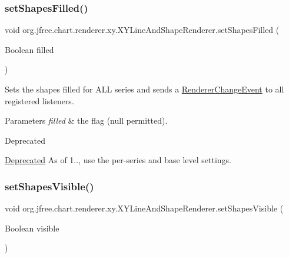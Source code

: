 \subsubsection{\texorpdfstring{set\+Shapes\+Filled()}{setShapesFilled()}\hspace{0.1cm}{\footnotesize\ttfamily [2/2]}}
{\footnotesize\ttfamily void org.\+jfree.\+chart.\+renderer.\+xy.\+X\+Y\+Line\+And\+Shape\+Renderer.\+set\+Shapes\+Filled (\begin{DoxyParamCaption}\item[{Boolean}]{filled }\end{DoxyParamCaption})}

Sets the \textquotesingle{}shapes filled\textquotesingle{} for A\+LL series and sends a \mbox{\hyperlink{}{Renderer\+Change\+Event}} to all registered listeners.


\begin{DoxyParams}{Parameters}
{\em filled} & the flag ({\ttfamily null} permitted).\\
\hline
\end{DoxyParams}
\begin{DoxyRefDesc}{Deprecated}
\item[\mbox{\hyperlink{deprecated__deprecated000249}{Deprecated}}]As of 1.., use the per-\/series and base level settings. \end{DoxyRefDesc}
\mbox{\label{classorg_1_1jfree_1_1chart_1_1renderer_1_1xy_1_1_x_y_line_and_shape_renderer_a1e887ed2b1e631fa9da701341b764c43}} 
\subsubsection{\texorpdfstring{set\+Shapes\+Visible()}{setShapesVisible()}\hspace{0.1cm}{\footnotesize\ttfamily [1/2]}}
{\footnotesize\ttfamily void org.\+jfree.\+chart.\+renderer.\+xy.\+X\+Y\+Line\+And\+Shape\+Renderer.\+set\+Shapes\+Visible (\begin{DoxyParamCaption}\item[{Boolean}]{visible }\end{DoxyParamCaption})}


